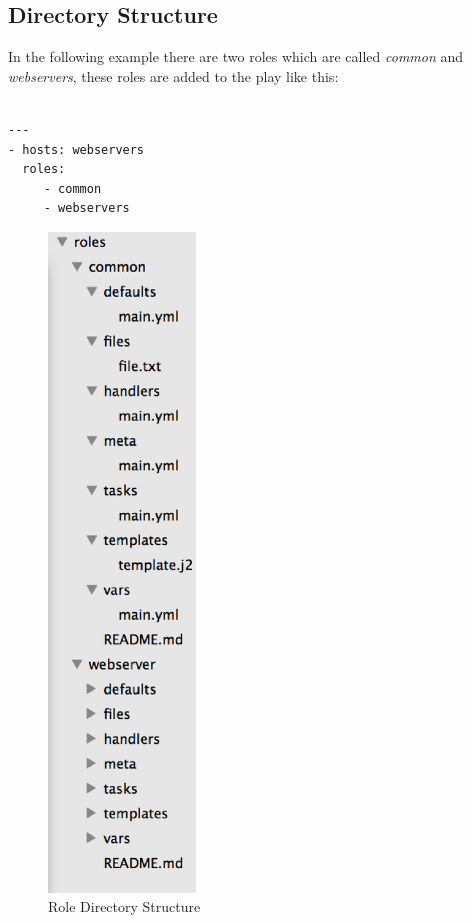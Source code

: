 \documentclass[10pt]{book}
\begin{document}
\subsection{Directory Structure}
 In the following example there are two roles which are called \emph{common} and \emph{webservers}, 
 these roles are added to the play like this:

\begin{Verbatim} 
 
---
- hosts: webservers
  roles:
     - common
     - webservers

\end{Verbatim}


\begin{figure}
  \begin{center}
    \includegraphics[width=0.35\textwidth]{figures/roles-directory.eps}
   \end{center}
   \caption{Role Directory Structure}
	\label{fig:roles}
\end{figure}
\end{document}
